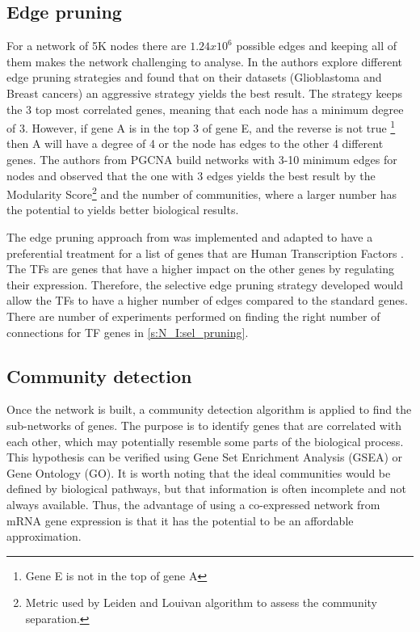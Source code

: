 \subsection{Edge pruning}

For a network of 5K nodes there are $1.24x10^6$ possible edges and keeping all of them makes the network challenging to analyse. In \citet{Care2019-ij} the authors explore different edge pruning strategies and found that on their datasets (Glioblastoma and Breast cancers) an aggressive strategy yields the best result. The strategy keeps the 3 top most correlated genes, meaning that each node has a minimum degree of 3. However, if gene A is in the top 3 of gene E, and the reverse is not true \footnote{Gene E is not in the top of gene A} then A will have a degree of 4 or the node has edges to the other 4 different genes. The authors from PGCNA build networks with 3-10 minimum edges for nodes and observed that the one with 3 edges yields the best result by the Modularity Score\footnote{Metric used by Leiden and Louivan algorithm to assess the community separation.} and the number of communities, where a larger number has the potential to yields better biological results.

The edge pruning approach from \citet{Care2019-ij} was implemented and adapted to have a preferential treatment for a list of genes that are Human Transcription Factors \citet{Lambert2018-el}. The TFs are genes that have a higher impact on the other genes by regulating their expression. Therefore, the selective edge pruning strategy developed would allow the TFs to have a higher number of edges compared to the standard genes. There are number of experiments performed on finding the right number of connections for TF genes in \cref{s:N_I:sel_pruning}.

\subsection{Community detection}

Once the network is built, a community detection algorithm is applied to find the sub-networks of genes. The purpose is to identify genes that are correlated with each other, which may potentially resemble some parts of the biological process. This hypothesis can be verified using Gene Set Enrichment Analysis (GSEA) or Gene Ontology (GO). It is worth noting that the ideal communities would be defined by biological pathways, but that information is often incomplete and not always available. Thus, the advantage of using a co-expressed network from mRNA gene expression is that it has the potential to be an affordable approximation.


